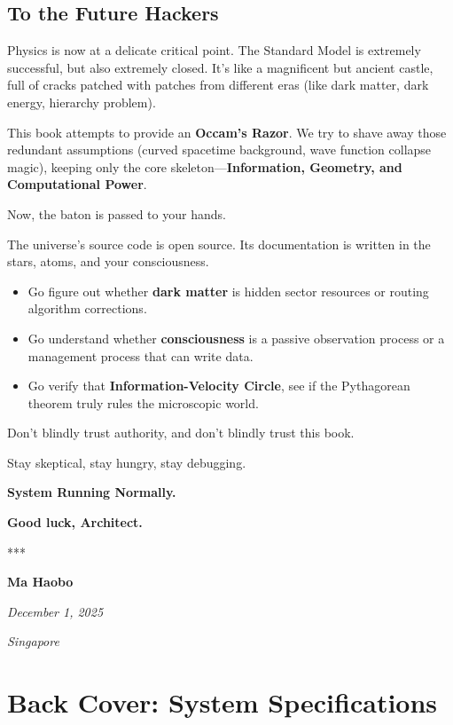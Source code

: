 \documentclass[11pt,a4paper,twoside]{book}
\begin{document}
\section{To the Future Hackers}

Physics is now at a delicate critical point. The Standard Model is extremely successful, but also extremely closed. It's like a magnificent but ancient castle, full of cracks patched with patches from different eras (like dark matter, dark energy, hierarchy problem).

This book attempts to provide an \textbf{Occam's Razor}. We try to shave away those redundant assumptions (curved spacetime background, wave function collapse magic), keeping only the core skeleton---\textbf{Information, Geometry, and Computational Power}.

Now, the baton is passed to your hands.

The universe's source code is open source. Its documentation is written in the stars, atoms, and your consciousness.

\begin{itemize}
\item Go figure out whether \textbf{dark matter} is hidden sector resources or routing algorithm corrections.

\item Go understand whether \textbf{consciousness} is a passive observation process or a management process that can write data.

\item Go verify that \textbf{Information-Velocity Circle}, see if the Pythagorean theorem truly rules the microscopic world.
\end{itemize}

Don't blindly trust authority, and don't blindly trust this book.

Stay skeptical, stay hungry, stay debugging.

\textbf{System Running Normally.}

\textbf{Good luck, Architect.}

***

\textbf{Ma Haobo}

\textit{December 1, 2025}

\textit{Singapore}

\clearpage{}

\clearpage{}\chapter*{Back Cover: System Specifications}
\end{document}
